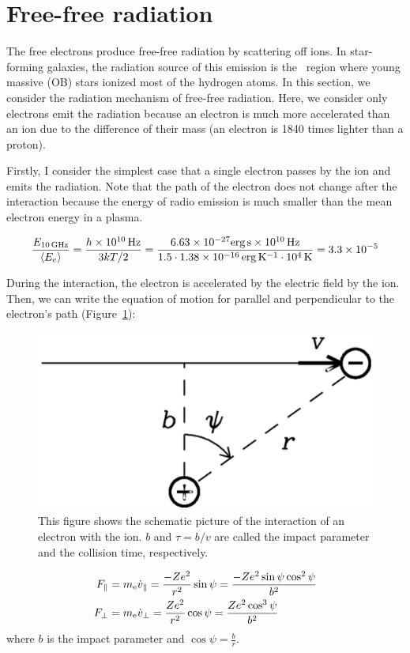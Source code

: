 \section{Free-free radiation}\label{sec:freefreeradiation}

The free electrons produce free-free radiation by scattering off ions.
In star-forming galaxies, the radiation source of this emission is the \ih~region where young massive (OB) stars ionized most of the hydrogen atoms.
In this section, we consider the radiation mechanism of free-free radiation.
Here, we consider only electrons emit the radiation because an electron is much more accelerated than an ion due to the difference of their mass (an electron is 1840 times lighter than a proton).

Firstly, I consider the simplest case that a single electron passes by the ion and emits the radiation.
Note that the path of the electron does not change after the interaction because the energy of radio emission is much smaller than the mean electron energy in a plasma.

\begin{equation}\label{eq:essential_radio4n12}
    \frac{E_{\mathrm{10\,\mathrm{GHz}}}}{\left\langle E_e\right\rangle} = \frac{h \times 10^{10}\,\mathrm{Hz}}{3kT / 2} = \frac{6.63 \times 10^{-27} \mathrm{erg\,s} \times 10^{10}\,\mathrm{Hz}}{1.5 \cdot 1.38 \times 10^{-16}\,\mathrm{erg\,K^{-1}} \cdot 10^4\,\mathrm{K}} = 3.3 \times 10^{-5}
\end{equation}

During the interaction, the electron is accelerated by the electric field by the ion.
Then, we can write the equation of motion for parallel and perpendicular to the electron's path (Figure~\ref{fig:nrao_radio4n2}):

\begin{figure}[htbp]
	\centering
	\includegraphics[width=.5\linewidth]{Chapter_2/Figures/NRAO_radio4n2.png}
    \caption[The schematic image of the interaction of an electron with the ion]{\label{fig:nrao_radio4n2}
        This figure shows the schematic picture of the interaction of an electron with the ion.
        $b$ and $\tau = b/v$ are called the impact parameter and the collision time, respectively.
    }
\end{figure}
\begin{align}
    F_{\|} &= m_{\mathrm{e}} \dot{v}_{\|}=\frac{-Z e^{2}}{r^{2}} \sin \psi=\frac{-Z e^{2} \sin \psi \cos ^{2} \psi}{b^{2}}\label{eq:essential_radio4n15}\\
    F_{\perp} &= m_{\mathrm{e}} \dot{v}_{\perp}=\frac{Z e^{2}}{r^{2}} \cos \psi=\frac{Z e^{2} \cos ^{3} \psi}{b^{2}}\label{eq:essential_radio4n16}
\end{align}
where $b$ is the impact parameter and $\cos\psi = \frac{b}{r}$.


